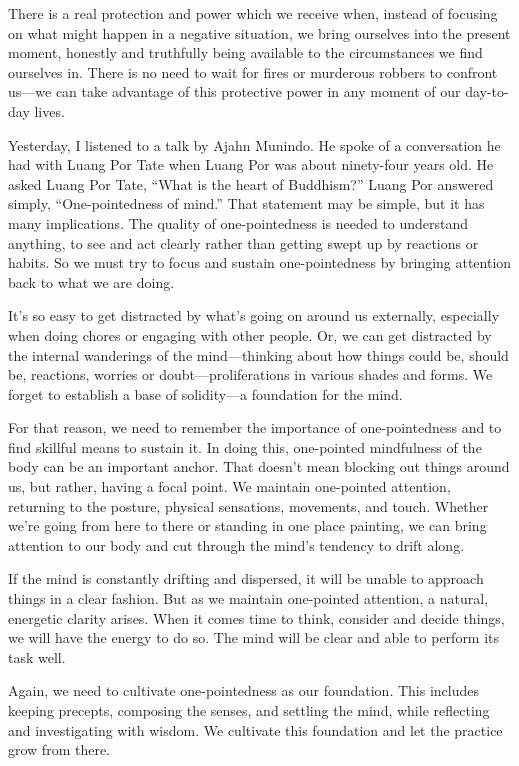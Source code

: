 There is a real protection and power which we receive when, instead of 
focusing on what might happen in a negative situation, we bring 
ourselves into the present moment, honestly and truthfully being 
available to the circumstances we find ourselves in. There is no need 
to wait for fires or murderous robbers to confront us---we can take 
advantage of this protective power in any moment of our day-to-day 
lives.


Yesterday, I listened to a talk by Ajahn Munindo. He spoke of a 
conversation he had with Luang Por Tate when Luang Por was about 
ninety-four years old. He asked Luang Por Tate, ``What is the heart of 
Buddhism?'' Luang Por answered simply, ``One-pointedness of mind.'' 
That statement may be simple, but it has many implications. The quality 
of one-pointedness is needed to understand anything, to see and act 
clearly rather than getting swept up by reactions or habits. So we must 
try to focus and sustain one-pointedness by bringing attention back to 
what we are doing.

It's so easy to get distracted by what's going on around us externally, 
especially when doing chores or engaging with other people. Or, we can 
get distracted by the internal wanderings of the mind---thinking about 
how things could be, should be, reactions, worries or 
doubt---proliferations in various shades and forms. We forget to 
establish a base of solidity---a foundation for the mind.

For that reason, we need to remember the importance of one-pointedness 
and to find skillful means to sustain it. In doing this, one-pointed 
mindfulness of the body can be an important anchor. That doesn't mean 
blocking out things around us, but rather, having a focal point. We 
maintain one-pointed attention, returning to the posture, physical 
sensations, movements, and touch. Whether we're going from here to 
there or standing in one place painting, we can bring attention to our 
body and cut through the mind's tendency to drift along.

If the mind is constantly drifting and dispersed, it will be unable to 
approach things in a clear fashion. But as we maintain one-pointed 
attention, a natural, energetic clarity arises. When it comes time to 
think, consider and decide things, we will have the energy to do so. 
The mind will be clear and able to perform its task well.

Again, we need to cultivate one-pointedness as our foundation. This 
includes keeping precepts, composing the senses, and settling the mind, 
while reflecting and investigating with wisdom. We cultivate this 
foundation and let the practice grow from there.


